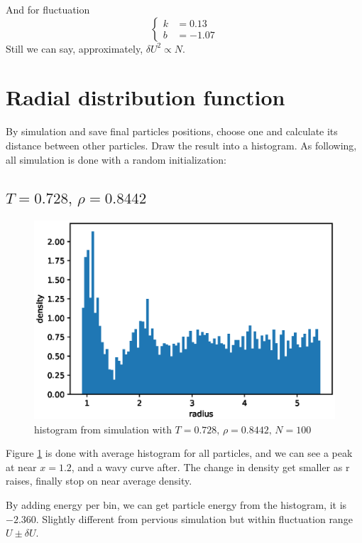 \documentclass[UTF8,a4paper]{article}
\begin{document}
And for fluctuation
\begin{equation}
	\left\{
	\begin{aligned}
		k & = 0.13  \\
		b & = -1.07
	\end{aligned}
	\right.
\end{equation}
Still we can say, approximately, $\delta U^2\propto N$.

\section{Radial distribution function}
By simulation and save final particles positions, choose one and calculate its distance between other particles. Draw the result into a histogram. As following,
all simulation is done with a random initialization:

\subsection{$T =0.728,\, \rho = 0.8442$}
\begin{figure}[h]
	\centering
	\includegraphics[height=0.2\textheight]{fig/exp1_rdf_peri_1.eps}
	\caption{histogram from simulation with $T =0.728,\, \rho = 0.8442,\, N=100$}
	\label{fig:rdf-1}
\end{figure}
Figure \ref{fig:rdf-1} is done with average histogram for all particles, and we can see a peak at near $x = 1.2$, and a wavy curve after. The change in density get smaller as
r raises, finally stop on near average density.

By adding energy per bin, we can get particle energy from the histogram, it is $-2.360$. Slightly different from pervious simulation but within fluctuation range $U\pm\delta U$.
\end{document}

